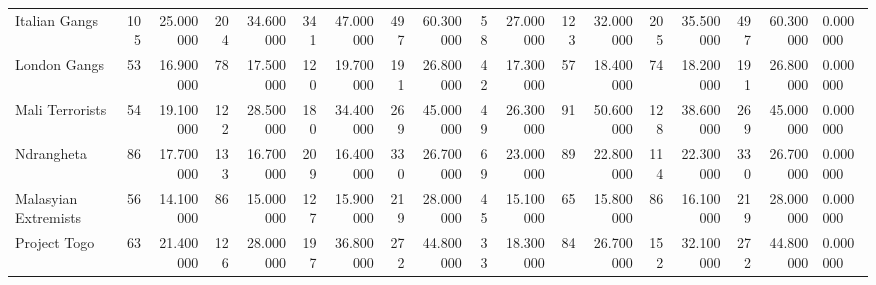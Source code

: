 \begin{tabular}{lrrrrrrrrrrrrrrrrl}
Italian Gangs & 105 & 25.000000 & 204 & 34.600000 & 341 & 47.000000 & 497 & 60.300000 & 58 & 27.000000 & 123 & 32.000000 & 205 & 35.500000 & 497 & 60.300000 & 0.000000 \\
London Gangs & 53 & 16.900000 & 78 & 17.500000 & 120 & 19.700000 & 191 & 26.800000 & 42 & 17.300000 & 57 & 18.400000 & 74 & 18.200000 & 191 & 26.800000 & 0.000000 \\
Mali Terrorists & 54 & 19.100000 & 122 & 28.500000 & 180 & 34.400000 & 269 & 45.000000 & 49 & 26.300000 & 91 & 50.600000 & 128 & 38.600000 & 269 & 45.000000 & 0.000000 \\
Ndrangheta & 86 & 17.700000 & 133 & 16.700000 & 209 & 16.400000 & 330 & 26.700000 & 69 & 23.000000 & 89 & 22.800000 & 114 & 22.300000 & 330 & 26.700000 & 0.000000 \\
Malasyian Extremists & 56 & 14.100000 & 86 & 15.000000 & 127 & 15.900000 & 219 & 28.000000 & 45 & 15.100000 & 65 & 15.800000 & 86 & 16.100000 & 219 & 28.000000 & 0.000000 \\
Project Togo & 63 & 21.400000 & 126 & 28.000000 & 197 & 36.800000 & 272 & 44.800000 & 33 & 18.300000 & 84 & 26.700000 & 152 & 32.100000 & 272 & 44.800000 & 0.000000 \\
\end{tabular}
